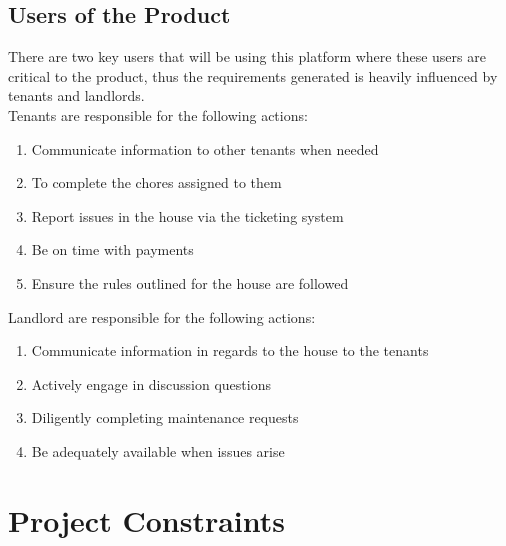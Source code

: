 \documentclass[12pt, titlepage]{article}
\begin{document}
\subsection{Users of the Product}
There are two key users that will be using this platform where these users are 
critical to the product, thus the requirements generated is heavily influenced 
by tenants and landlords.\\
Tenants are responsible for the following actions:
\begin{enumerate}
\item Communicate information to other tenants when needed
\item To complete the chores assigned to them
\item Report issues in the house via the ticketing system
\item Be on time with payments
\item Ensure the rules outlined for the house are followed
\end{enumerate}
Landlord are responsible for the following actions:
\begin{enumerate}
\item Communicate information in regards to the house to the tenants
\item Actively engage in discussion questions
\item Diligently completing maintenance requests
\item Be adequately available when issues arise
\end{enumerate}


\section{Project Constraints}
\end{document}
